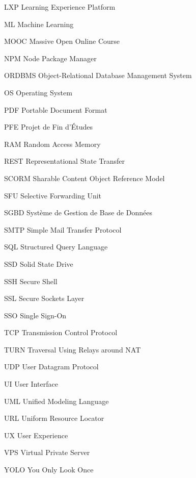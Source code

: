 \begin{abbrv}
    \item[LXP] Learning Experience Platform
    \item[ML] Machine Learning
    \item[MOOC] Massive Open Online Course
    \item[NPM] Node Package Manager
    \item[ORDBMS] Object-Relational Database Management System
    \item[OS] Operating System
    \item[PDF] Portable Document Format
    \item[PFE] Projet de Fin d'Études
    \item[RAM] Random Access Memory
    \item[REST] Representational State Transfer
    \item[SCORM] Sharable Content Object Reference Model
    \item[SFU] Selective Forwarding Unit
    \item[SGBD] Système de Gestion de Base de Données
    \item[SMTP] Simple Mail Transfer Protocol
    \item[SQL] Structured Query Language
    \item[SSD] Solid State Drive
    \item[SSH] Secure Shell
    \item[SSL] Secure Sockets Layer
    \item[SSO] Single Sign-On
    \item[TCP] Transmission Control Protocol
    \item[TURN] Traversal Using Relays around NAT
    \item[UDP] User Datagram Protocol
    \item[UI] User Interface
    \item[UML] Unified Modeling Language
    \item[URL] Uniform Resource Locator
    \item[UX] User Experience
    \item[VPS] Virtual Private Server
    \item[YOLO] You Only Look Once

\end{abbrv}
